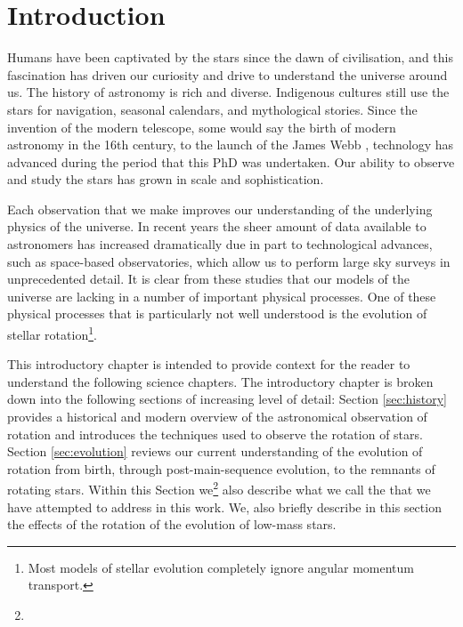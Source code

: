 
\newcommand\dive{\textmd{div}}
\newcommand\der{\textmd{d}}
\newcommand\rper{$R_{\rm{per}}$}

\chapter{Introduction}
\label{chap:intro}

Humans have been captivated by the stars since the dawn of civilisation, and this fascination has driven our curiosity and drive to understand the universe around us. 
The history of astronomy is rich and diverse. 
Indigenous cultures still use the stars for navigation, seasonal calendars, and mythological stories. 
Since the invention of the modern telescope, some would say the birth of modern astronomy in the 16th century, to the launch of the James Webb , technology has advanced during the period that this PhD was undertaken. 
Our ability to observe and study the stars has grown in scale and sophistication. 

Each observation that we make improves our understanding of the underlying physics of the universe. 
In recent years the sheer amount of data available to astronomers has increased dramatically due in part to technological advances, such as space-based observatories, which allow us to perform large sky surveys in unprecedented detail. 
It is clear from these studies that our models of the universe are lacking in a number of important physical processes. 
One of these physical processes that is particularly not well understood is the evolution of stellar rotation\footnote{Most models of stellar evolution completely ignore angular momentum transport.}.

This introductory chapter is intended to provide context for the reader to understand the following science chapters. 
The introductory chapter is broken down into the following sections of increasing level of detail:
Section \ref{sec:history} provides a historical and modern overview of the astronomical observation of rotation and introduces the techniques used to observe the rotation of stars.
Section \ref{sec:evolution} reviews our current understanding of the evolution of rotation from birth, through post-main-sequence evolution, to the remnants of rotating stars. Within this Section we\footnote{} also describe what we call the  that we have attempted to address in this work. We, also briefly describe in this section the effects of the rotation of the evolution of low-mass stars.

